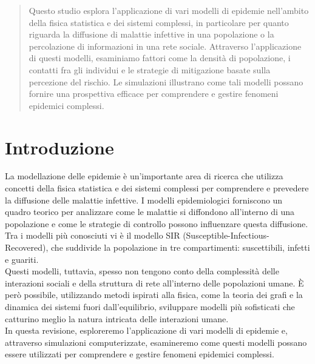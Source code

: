 \documentclass{article}
\title{}
\author{Thomas Del Moro}
\begin{document}
    \maketitle
    \begin{abstract}
        Questo studio esplora l'applicazione di vari modelli di epidemie nell'ambito della fisica statistica e dei
        sistemi complessi, in particolare per quanto riguarda la diffusione di malattie infettive in una popolazione o
        la percolazione di informazioni in una rete sociale.
        Attraverso l'applicazione di questi modelli, esaminiamo fattori come la densità di popolazione, i contatti fra
        gli individui e le strategie di mitigazione basate sulla percezione del rischio.
        Le simulazioni illustrano come tali modelli possano fornire una prospettiva efficace per comprendere e gestire
        fenomeni epidemici complessi.
    \end{abstract}


    \section{Introduzione}
    La modellazione delle epidemie è un'importante area di ricerca che utilizza concetti della fisica statistica e dei
    sistemi complessi per comprendere e prevedere la diffusione delle malattie infettive.
    I modelli epidemiologici forniscono un quadro teorico per analizzare come le malattie si diffondono all'interno di
    una popolazione e come le strategie di controllo possono influenzare questa diffusione.
    Tra i modelli più conosciuti vi è il modello SIR (Susceptible-Infectious-Recovered), che suddivide la popolazione
    in tre compartimenti: suscettibili, infetti e guariti.\\
    Questi modelli, tuttavia, spesso non tengono conto della complessità delle interazioni sociali e della struttura di
    rete all'interno delle popolazioni umane.
    È però possibile, utilizzando metodi ispirati alla fisica, come la teoria
    dei grafi e la dinamica dei sistemi fuori dall'equilibrio, sviluppare modelli più sofisticati che catturino meglio
    la natura intricata delle interazioni umane.\\
    In questa revisione, esploreremo l'applicazione di vari modelli di epidemie e, attraverso simulazioni computerizzate,
    esamineremo come questi modelli possano essere utilizzati per comprendere e gestire fenomeni epidemici complessi.
\end{document}
